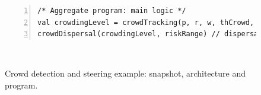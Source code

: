 \begin{figure}
\begin{minipage}{\textwidth}
\begin{lstlisting}[escapechar=\%,numbers=left]
/* Aggregate program: main logic */
val crowdingLevel = crowdTracking(p, r, w, thCrowd, thDanger, t)
crowdDispersal(crowdingLevel, riskRange) // dispersal advice
\end{lstlisting}
%
\end{minipage}\\[0.2cm]
\caption{Crowd detection and steering example: snapshot, architecture and program.}
\label{fig:crowd-example}
\end{figure}

